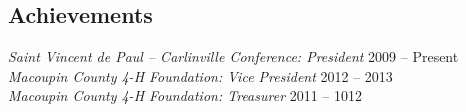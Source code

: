 \documentclass[margin,line]{resume}
\begin{document}
\begin{resume}
\section{Achievements}

{\sl Saint Vincent de Paul -- Carlinville Conference: President} \hfill 2009 -- Present\\
{\sl Macoupin County 4-H Foundation: Vice President} \hfill 2012 -- 2013\\
{\sl Macoupin County 4-H Foundation: Treasurer} \hfill 2011 -- 1012\\

\end{resume}
\end{document}
